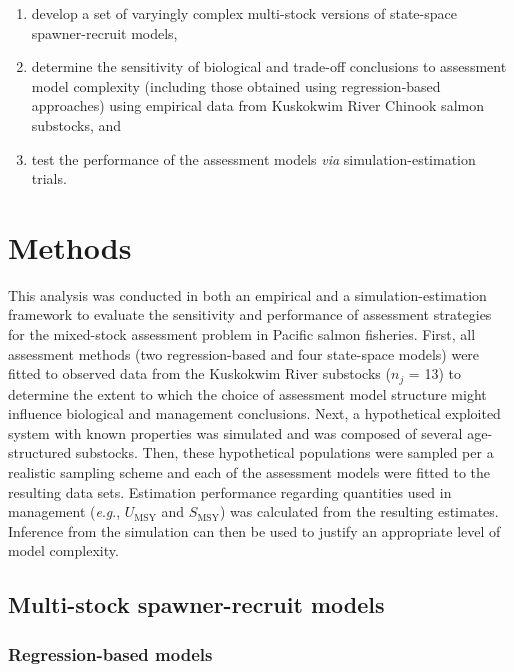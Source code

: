 \documentclass[12pt,]{book}
\theoremstyle{definition}
\theoremstyle{definition}
\theoremstyle{definition}
\theoremstyle{remark}
\begin{document}
\begin{enumerate}
\def\labelenumi{(\arabic{enumi})}
\item
  develop a set of varyingly complex multi-stock versions of state-space
  spawner-recruit models,
\item
  determine the sensitivity of biological and trade-off conclusions to
  assessment model complexity (including those obtained using
  regression-based approaches) using empirical data from Kuskokwim River
  Chinook salmon substocks, and
\item
  test the performance of the assessment models \emph{via}
  simulation-estimation trials.
\end{enumerate}

\section{Methods}\label{methods-2}

\noindent
This analysis was conducted in both an empirical and a
simulation-estimation framework to evaluate the sensitivity and
performance of assessment strategies for the mixed-stock assessment
problem in Pacific salmon fisheries. First, all assessment methods (two
regression-based and four state-space models) were fitted to observed
data from the Kuskokwim River substocks (\(n_j\) = 13) to determine the
extent to which the choice of assessment model structure might influence
biological and management conclusions. Next, a hypothetical exploited
system with known properties was simulated and was composed of several
age-structured substocks. Then, these hypothetical populations were
sampled per a realistic sampling scheme and each of the assessment
models were fitted to the resulting data sets. Estimation performance
regarding quantities used in management (\emph{e}.\emph{g}.,
\(U_{\text{MSY}}\) and \(S_{\text{MSY}}\)) was calculated from the
resulting estimates. Inference from the simulation can then be used to
justify an appropriate level of model complexity.

\subsection{Multi-stock spawner-recruit models}\label{model-methods}

\subsubsection{Regression-based models}\label{reg-methods}
\end{document}
